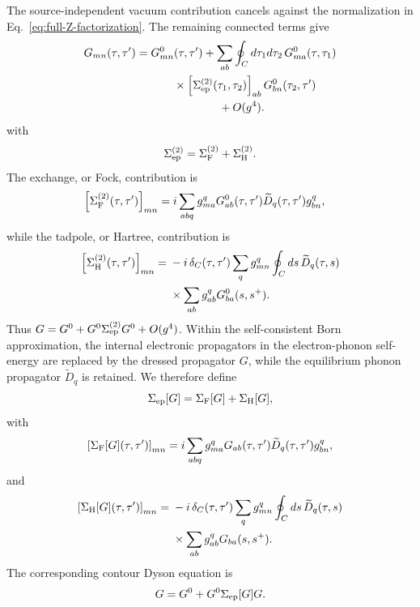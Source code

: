 \documentclass[
 reprint,
 superscriptaddress,
 amsmath,amssymb,
 aps,prb,
 longbibliography,
 floatfix
]{revtex4-2}
\begin{document}
The source-independent vacuum contribution cancels against the
normalization in Eq.~\eqref{eq:full-Z-factorization}. The remaining
connected terms give
\begin{equation*}
\begin{aligned}
G_{mn}(\tau,\tau')
={}&
G_{mn}^{0}(\tau,\tau')
+
\sum_{ab}
\oint_C d\tau_1d\tau_2\,
G_{ma}^{0}(\tau,\tau_1)
\\
&\qquad\times
\left[
\Sigma_{\rm ep}^{(2)}
(\tau_1,\tau_2)
\right]_{ab}
G_{bn}^{0}(\tau_2,\tau')
\\
&\qquad\qquad\qquad+
O(g^4).
\end{aligned}
\end{equation*}
with
\begin{equation*}
\Sigma_{\rm ep}^{(2)}
=
\Sigma_{\rm F}^{(2)}
+
\Sigma_{\rm H}^{(2)}.
\end{equation*}
The exchange, or Fock, contribution is
\begin{align*}
\left[
\Sigma_{\rm F}^{(2)}(\tau,\tau')
\right]_{mn}
={}&
i
\sum_{abq}
g_{ma}^{q}
G_{ab}^{0}(\tau,\tau')
\widetilde D_q(\tau,\tau')
g_{bn}^{q},
\end{align*}
while the tadpole, or Hartree, contribution is
\begin{align*}
\left[
\Sigma_{\rm H}^{(2)}(\tau,\tau')
\right]_{mn}
={}&
-i\,
\delta_C(\tau,\tau')
\sum_q
g_{mn}^{q}
\oint_C ds\,
\widetilde D_q(\tau,s)
\\
&\times
\sum_{ab}
g_{ab}^{q}
G_{ba}^{0}(s,s^+).
\end{align*}
Thus $G = G^0 + G^0\Sigma_{\rm ep}^{(2)}G^0 + O(g^4)$. Within the self-consistent Born approximation, the internal electronic propagators in the electron-phonon self-energy are replaced by the dressed propagator \(G\), while the equilibrium phonon propagator \(\widetilde D_q\) is retained. We therefore define
\begin{equation}
\Sigma_{\rm ep}[G]
=
\Sigma_{\rm F}[G]
+
\Sigma_{\rm H}[G],
\label{eq:SCBA-self-energy-total}
\end{equation}
with
\begin{equation}
\left[
\Sigma_{\rm F}[G](\tau,\tau')
\right]_{mn}
=
i
\sum_{abq}
g_{ma}^{q}
G_{ab}(\tau,\tau')
\widetilde D_q(\tau,\tau')
g_{bn}^{q},
\label{eq:SCBA-Fock-contour}
\end{equation}
and
\begin{align}
\left[
\Sigma_{\rm H}[G](\tau,\tau')
\right]_{mn}
={}&
-i\,
\delta_C(\tau,\tau')
\sum_q
g_{mn}^{q}
\oint_C ds\,
\widetilde D_q(\tau,s) \notag
\\
&\times
\sum_{ab}
g_{ab}^{q}
G_{ba}(s,s^+).
\label{eq:SCBA-Hartree-contour}
\end{align}
The corresponding contour Dyson equation is
\begin{equation}
G
=
G^0
+
G^0\Sigma_{\rm ep}[G]G.
\label{eq:scba-dyson-g0}
\end{equation}
\end{document}
